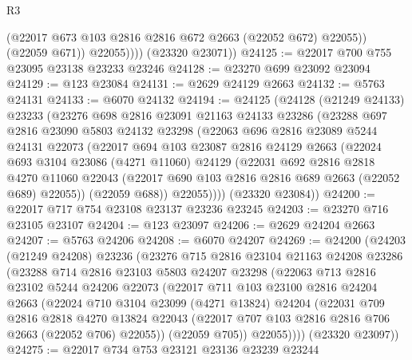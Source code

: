 \begin{lexlean}{R3}
\begin{coremodule}
                  (@22017 @673 @103 @2816 @2816 @672 @2663 (@22052 @672) @22055))
                (@22059 @671))
              @22055))))
      (@23320 @23071))
@24125 := @22017 @700 @755 @23095 @23138 @23233 @23246
@24128 := @23270 @699 @23092 @23094
@24129 := @123 @23084
@24131 := @2629 @24129 @2663
@24132 := @5763 @24131
@24133 := @6070 @24132
@24194 := @24125
    (@24128
      (@21249 @24133)
      @23233
      (@23276
        @698
        @2816
        @23091
        @21163
        @24133
        @23286
        (@23288
          @697
          @2816
          @23090
          @5803
          @24132
          @23298
          (@22063
            @696
            @2816
            @23089
            @5244
            @24131
            @22073
            (@22017
              @694
              @103
              @23087
              @2816
              @24129
              @2663
              (@22024
                @693
                @3104
                @23086
                (@4271 @11060)
                @24129
                (@22031
                  @692
                  @2816
                  @2818
                  @4270
                  @11060
                  @22043
                  (@22017 @690 @103 @2816 @2816 @689 @2663 (@22052 @689) @22055))
                (@22059 @688))
              @22055))))
      (@23320 @23084))
@24200 := @22017 @717 @754 @23108 @23137 @23236 @23245
@24203 := @23270 @716 @23105 @23107
@24204 := @123 @23097
@24206 := @2629 @24204 @2663
@24207 := @5763 @24206
@24208 := @6070 @24207
@24269 := @24200
    (@24203
      (@21249 @24208)
      @23236
      (@23276
        @715
        @2816
        @23104
        @21163
        @24208
        @23286
        (@23288
          @714
          @2816
          @23103
          @5803
          @24207
          @23298
          (@22063
            @713
            @2816
            @23102
            @5244
            @24206
            @22073
            (@22017
              @711
              @103
              @23100
              @2816
              @24204
              @2663
              (@22024
                @710
                @3104
                @23099
                (@4271 @13824)
                @24204
                (@22031
                  @709
                  @2816
                  @2818
                  @4270
                  @13824
                  @22043
                  (@22017 @707 @103 @2816 @2816 @706 @2663 (@22052 @706) @22055))
                (@22059 @705))
              @22055))))
      (@23320 @23097))
@24275 := @22017 @734 @753 @23121 @23136 @23239 @23244

\end{coremodule}
\end{lexlean}
